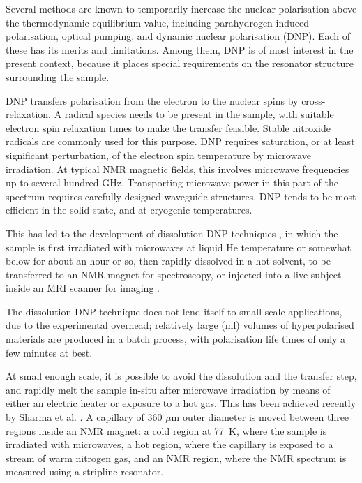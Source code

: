 Several methods are known to temporarily increase the
nuclear polarisation above the thermodynamic equilibrium value,
including parahydrogen-induced polarisation, optical pumping, and
dynamic nuclear polarisation (DNP). Each of these has its
merits and limitations. Among them, DNP is of most interest in the
present context, because it places special requirements on the resonator
structure surrounding the sample. 

DNP transfers polarisation from the
electron to the nuclear spins by cross-relaxation. A radical
species needs to be present in the sample, with suitable electron spin
relaxation times to make the transfer feasible. 
Stable nitroxide radicals are commonly used for this
purpose. DNP requires saturation, or at least significant perturbation,
of the electron spin temperature by microwave irradiation. At typical
NMR magnetic fields, this involves microwave frequencies up to several
hundred GHz. Transporting microwave power in this part of the spectrum
requires carefully designed waveguide structures. DNP tends to be most
efficient in the solid state, and at cryogenic temperatures.

This has led to the development of dissolution-DNP techniques
\cite{ArdenkjaerLarsen:2016jq}, in which the sample is first irradiated with microwaves 
at liquid He temperature or somewhat below for about an hour or
so, then rapidly dissolved in a hot solvent, to be transferred to
an NMR magnet for spectroscopy, or injected into a live subject inside an MRI
scanner for imaging \cite{Brindle:2011hu}. 

The dissolution DNP technique does not lend itself to small scale applications,
due to the experimental overhead; relatively large (ml) volumes of 
hyperpolarised materials are produced in a batch process, with polarisation
life times of only a few minutes at best.

At small enough scale, it is possible to avoid the
dissolution and the transfer step, and rapidly melt the sample in-situ
after microwave irradiation by means of either an electric heater or
exposure to a hot gas. This has been achieved recently by Sharma et al.
\cite{Sharma:2015ce}. A capillary of 360 $\mu$m outer diameter is moved
between three regions inside an NMR magnet: a cold region at 77~K, where
the sample is irradiated with microwaves, a hot region, where the
capillary is exposed to a stream of warm nitrogen gas, and an NMR
region, where the NMR spectrum is measured using a stripline resonator.


